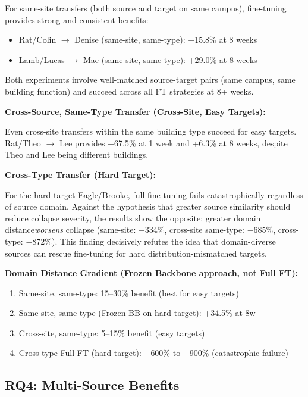 \documentclass[12pt,a4paper]{report}
\begin{document}
For same-site transfers (both source and target on same campus), fine-tuning provides strong and consistent benefits:

\begin{itemize}
    \item Rat/Colin $\to$ Denise (same-site, same-type): +15.8\% at 8 weeks
    \item Lamb/Lucas $\to$ Mae (same-site, same-type): +29.0\% at 8 weeks
\end{itemize}

Both experiments involve well-matched source-target pairs (same campus, same building function) and succeed across all FT strategies at 8+ weeks.

\textbf{Cross-Source, Same-Type Transfer (Cross-Site, Easy Targets):}

Even cross-site transfers within the same building type succeed for easy targets. Rat/Theo $\to$ Lee provides +67.5\% at 1 week and +6.3\% at 8 weeks, despite Theo and Lee being different buildings.

\textbf{Cross-Type Transfer (Hard Target):}

For the hard target Eagle/Brooke, full fine-tuning fails catastrophically regardless of source domain. Against the hypothesis that greater source similarity should reduce collapse severity, the results show the opposite: greater domain distance\textit{worsens} collapse (same-site: $-$334\%, cross-site same-type: $-$685\%, cross-type: $-$872\%). This finding decisively refutes the idea that domain-diverse sources can rescue fine-tuning for hard distribution-mismatched targets.

\textbf{Domain Distance Gradient (Frozen Backbone approach, not Full FT):}
\begin{enumerate}
    \item Same-site, same-type: 15--30\% benefit (best for easy targets)
    \item Same-site, same-type (Frozen BB on hard target): +34.5\% at 8w
    \item Cross-site, same-type: 5--15\% benefit (easy targets)
    \item Cross-type Full FT (hard target): $-$600\% to $-$900\% (catastrophic failure)
\end{enumerate}

\subsection{RQ4: Multi-Source Benefits}
\end{document}
